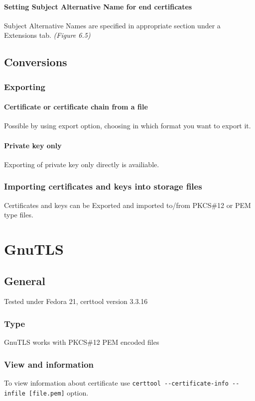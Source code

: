 \documentclass[10pt, a4paper]{report}
\begin{document}
{    \subsubsection{Setting Subject Alternative Name for end certificates}
Subject Alternative Names are specified in appropriate section under a Extensions tab.
\textit{(Figure 6.5)}

\section{Conversions}

  \subsection{Exporting}
  
    \subsubsection{Certificate or certificate chain from a file}
Possible by using export option, choosing in which format you want to export it.

    \subsubsection{Private key only}
Exporting of private key only directly is availiable.

  \subsection{Importing certificates and keys into storage files}
Certificates and keys can be Exported and imported to/from PKCS\#12 or PEM type files.

\chapter{GnuTLS}

\section{General}

Tested under Fedora 21, certtool version 3.3.16

  \subsection{Type}
GnuTLS works with PKCS\#12 PEM encoded files
  \subsection{View and information}
To view information about certificate use \verb+certtool --certificate-info --infile [file.pem]+ option.
}
\end{document}
